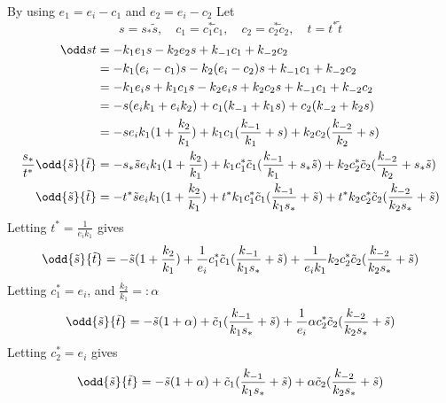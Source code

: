 \documentclass{X:/Documents/Coding/Latex/myassignment}
\begin{document}
\begin{enumerate}
\begin{enumerate}
		By using $e_1 = e_i - c_1$ and $e_2 = e_i - c_2$
		Let
		\[s = s_*\tilde{s} , \quad c_1 = c_1^* \tilde{c}_1 , \quad c_2 = c_2^*\tilde{c}_2, \quad t = t^*\tilde{t}\]
		\begin{align*}
			\odd st &=-k_1e_1s -k_2e_2 s + k_{-1}c_1 + k_{-2} c_2\\			
			&=-k_1(e_i - c_1)s -k_2 (e_i - c_2) s + k_{-1}c_1 + k_{-2} c_2\\
			&=-k_1e_i s + k_1c_1s -k_2 e_is +k_2 c_2 s + k_{-1}c_1 + k_{-2} c_2\\
			&=-s(e_ik_1 +e_ik_2) + c_1(k_{-1} + k_1 s) + c_2(k_{-2} + k_2 s)\\
			&=-se_ik_1(1 +\frac{k_2}{k_1}) + k_1c_1(\frac{k_{-1}}{k_1} + s) + k_2c_2(\frac{k_{-2}}{k_2} + s)\\
			\frac{s_*}{t^*} \odd{\tilde s}{\tilde t} &=-s_*\tilde{s}e_ik_1(1 +\frac{k_2}{k_1}) + k_1c_1^* \tilde{c}_1 (\frac{k_{-1}}{k_1} + s_*\tilde{s}) + k_2c_2^*\tilde{c}_2(\frac{k_{-2}}{k_2} + s_*\tilde{s})\\
			\odd{\tilde s}{\tilde t} &=-t^*\tilde{s}e_ik_1(1 +\frac{k_2}{k_1}) + t^*k_1c_1^* \tilde{c}_1 (\frac{k_{-1}}{k_1 s_*} + \tilde{s}) + t^*k_2c_2^*\tilde{c}_2(\frac{k_{-2}}{k_2s_*} + \tilde{s})\\
		\end{align*}
		Letting $t^* = \frac{1}{e_ik_1}$ gives
		\begin{align*}
			\odd{\tilde s}{\tilde t} &=-\tilde{s}(1 +\frac{k_2}{k_1}) + \frac{1}{e_i}c_1^* \tilde{c}_1 (\frac{k_{-1}}{k_1 s_*} + \tilde{s}) + \frac{1}{e_ik_1}k_2c_2^*\tilde{c}_2(\frac{k_{-2}}{k_2s_*} + \tilde{s})\\
		\end{align*}
		Letting $c_1^* = e_i$, and $\frac{k_2}{k_1} =: \alpha$
		\begin{align*}
			\odd{\tilde s}{\tilde t} &=-\tilde{s}(1 +\alpha) + \tilde{c}_1 (\frac{k_{-1}}{k_1 s_*} + \tilde{s}) + \frac{1}{e_i}\alpha c_2^*\tilde{c}_2(\frac{k_{-2}}{k_2s_*} + \tilde{s})\\
		\end{align*}
		Letting $c_2^* = e_i$ gives
		\begin{align*}
			\odd{\tilde s}{\tilde t} &=-\tilde{s}(1 +\alpha) + \tilde{c}_1 (\frac{k_{-1}}{k_1 s_*} + \tilde{s}) + \alpha \tilde{c}_2(\frac{k_{-2}}{k_2s_*} + \tilde{s})\\
		\end{align*}
		

\end{enumerate}
\end{enumerate}
\end{document}
